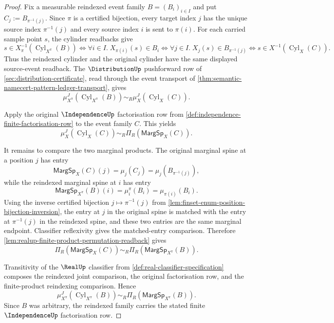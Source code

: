 \begin{proof}
Fix a measurable reindexed event family $B=(B_i)_{i\in I}$ and put $C_j:=B_{\pi^{-1}(j)}$. Since $\pi$ is a certified bijection, every target index $j$ has the unique source index $\pi^{-1}(j)$ and every source index $i$ is sent to $\pi(i)$. For each carried sample point $s$, the cylinder readbacks give
$$
s\in X^{-1}_{\pi}(\operatorname{Cyl}_{X^{\pi}}(B))
\Longleftrightarrow
\forall i\in I.\;X_{\pi(i)}(s)\in B_i
\Longleftrightarrow
\forall j\in I.\;X_j(s)\in B_{\pi^{-1}(j)}
\Longleftrightarrow
s\in X^{-1}(\operatorname{Cyl}_{X}(C)).
$$
Thus the reindexed cylinder and the original cylinder have the same displayed source-event readback. The $\DistributionUp$ pushforward row of \autoref{sec:distribution-certificate}, read through the event transport of \autoref{thm:semantic-namecert-pattern-ledger-transport}, gives
$$
\mu_{X^{\pi}}^J(\operatorname{Cyl}_{X^{\pi}}(B))
\sim_R
\mu_X^J(\operatorname{Cyl}_{X}(C)).
$$

Apply the original $\IndependenceUp$ factorisation row from \autoref{def:independence-finite-factorisation-row} to the event family $C$. This yields
$$
\mu_X^J(\operatorname{Cyl}_{X}(C))
\sim_R
\Pi_R(\mathsf{MargSp}_{X}(C)).
$$

It remains to compare the two marginal products. The original marginal spine at a position $j$ has entry
$$
\mathsf{MargSp}_{X}(C)(j)=\mu_j(C_j)=\mu_j(B_{\pi^{-1}(j)}),
$$
while the reindexed marginal spine at $i$ has entry
$$
\mathsf{MargSp}_{X^{\pi}}(B)(i)=\mu_i^{\pi}(B_i)=\mu_{\pi(i)}(B_i).
$$
Using the inverse certified bijection $j\mapsto\pi^{-1}(j)$ from \autoref{lem:finset-enum-position-bijection-inversion}, the entry at $j$ in the original spine is matched with the entry at $\pi^{-1}(j)$ in the reindexed spine, and these two entries are the same marginal endpoint. Classifier reflexivity gives the matched-entry comparison. Therefore \autoref{lem:realup-finite-product-permutation-readback} gives
$$
\Pi_R(\mathsf{MargSp}_{X}(C))
\sim_R
\Pi_R(\mathsf{MargSp}_{X^{\pi}}(B)).
$$

Transitivity of the $\RealUp$ classifier from \autoref{def:real-classifier-specification} composes the reindexed joint comparison, the original factorisation row, and the finite-product reindexing comparison. Hence
$$
\mu_{X^{\pi}}^J(\operatorname{Cyl}_{X^{\pi}}(B))
\sim_R
\Pi_R(\mathsf{MargSp}_{X^{\pi}}(B)).
$$
Since $B$ was arbitrary, the reindexed family carries the stated finite $\IndependenceUp$ factorisation row.
\end{proof}

